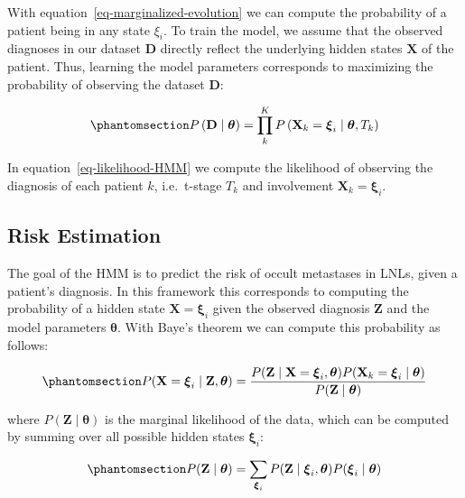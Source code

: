 \documentclass[
  sn-mathphys-num,
]{sn-jnl}
\begin{document}
With equation~\ref{eq-marginalized-evolution} we can compute the
probability of a patient being in any state \(\xi_i\). To train the
model, we assume that the observed diagnoses in our dataset
\(\mathbf{D}\) directly reflect the underlying hidden states
\(\mathbf{X}\) of the patient. Thus, learning the model parameters
corresponds to maximizing the probability of observing the dataset
\(\mathbf{D}\):

\begin{equation}\phantomsection\label{eq-likelihood-HMM}{
P \left( \mathbf{D} \mid \boldsymbol{\theta} \right) = \prod_k^K P \left( \mathbf{X}_k=\boldsymbol{\xi}_i \mid \boldsymbol{\theta}, T_k \right)
}\end{equation}

In equation~\ref{eq-likelihood-HMM} we compute the likelihood of
observing the diagnosis of each patient \(k\), i.e.~t-stage \(T_k\) and
involvement \(\mathbf{X}_k=\boldsymbol{\xi}_i\).

\subsection{Risk Estimation}\label{risk-estimation}

The goal of the HMM is to predict the risk of occult metastases in LNLs,
given a patient's diagnosis. In this framework this corresponds to
computing the probability of a hidden state
\(\mathbf{X}=\boldsymbol{\xi}_i\) given the observed diagnosis
\(\mathbf{Z}\) and the model parameters \(\boldsymbol{\theta}\). With
Baye's theorem we can compute this probability as follows:

\begin{equation}\phantomsection\label{eq-bayes}{
P(\mathbf{X} =\boldsymbol{\xi}_i \mid \mathbf{Z}, \boldsymbol{\theta}) = \frac{P(\mathbf{Z} \mid \mathbf{X}=\boldsymbol{\xi}_i, \boldsymbol{\theta}) P(\mathbf{X}_k=\boldsymbol{\xi}_i \mid \boldsymbol{\theta})}{P(\mathbf{Z} \mid \boldsymbol{\theta})}
}\end{equation}

where \(P(\mathbf{Z} \mid \boldsymbol{\theta})\) is the marginal
likelihood of the data, which can be computed by summing over all
possible hidden states \(\boldsymbol{\xi}_i\):

\begin{equation}\phantomsection\label{eq-marginal-likelihood}{
P(\mathbf{Z} \mid \boldsymbol{\theta}) = \sum_{\boldsymbol{\xi}_i} P(\mathbf{Z} \mid \boldsymbol{\xi}_i, \boldsymbol{\theta}) P(\boldsymbol{\xi}_i \mid \boldsymbol{\theta})
}\end{equation}
\end{document}
